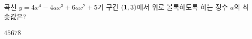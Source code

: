 곡선 $y=4x^4-4ax^3+6ax^2+5$가 구간 $(1{,}\mkern3mu\mathopen{}3)$에서 위로 볼록하도록 하는 정수 $a$의 최솟값은?
\begin{choices32}{$4$}{$5$}{$6$}{$7$}{$8$}\end{choices32}
